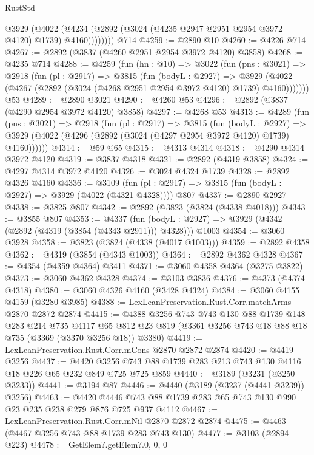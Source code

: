 \begin{lexlean}{RustStd}
\begin{coremodule}
            @3929
              (@4022 (@4234 (@2892 (@3024 (@4235 @2947 @2951 @2954 @3972 @4120) @1739) @4160))))))))
    @714
@4259 := @2890 @10
@4260 := @4226 @714
@4267 := @2892 (@3837 (@4260 @2951 @2954 @3972 @4120) @3858)
@4268 := @4235 @714
@4288 := @4259
    (fun (hn : @10) =>
    @3022
      (fun (pns : @3021) =>
      @2918
        (fun (pl : @2917) =>
        @3815
          (fun (bodyL : @2927) =>
          @3929 (@4022 (@4267 (@2892 (@3024 (@4268 @2951 @2954 @3972 @4120) @1739) @4160)))))))
    @53
@4289 := @2890 @3021
@4290 := @4260 @53
@4296 := @2892 (@3837 (@4290 @2954 @3972 @4120) @3858)
@4297 := @4268 @53
@4313 := @4289
    (fun (pns : @3021) =>
    @2918
      (fun (pl : @2917) =>
      @3815
        (fun (bodyL : @2927) =>
        @3929 (@4022 (@4296 (@2892 (@3024 (@4297 @2954 @3972 @4120) @1739) @4160))))))
@4314 := @59 @65
@4315 := @4313 @4314
@4318 := @4290 @4314 @3972 @4120
@4319 := @3837 @4318
@4321 := @2892 (@4319 @3858)
@4324 := @4297 @4314 @3972 @4120
@4326 := @3024 @4324 @1739
@4328 := @2892 @4326 @4160
@4336 := @3109 (fun (pl : @2917) => @3815 (fun (bodyL : @2927) => @3929 (@4022 (@4321 @4328)))) @807
@4337 := @2890 @2927
@4338 := @3825 @807
@4342 := @2892 (@3823 (@3824 (@4338 @4018)))
@4343 := @3855 @807
@4353 := @4337
    (fun (bodyL : @2927) => @3929 (@4342 (@2892 (@4319 (@3854 (@4343 @2911))) @4328)))
    @1003
@4354 := @3060 @3928
@4358 := @3823 (@3824 (@4338 (@4017 @1003)))
@4359 := @2892 @4358
@4362 := @4319 (@3854 (@4343 @1003))
@4364 := @2892 @4362 @4328
@4367 := @4354 (@4359 @4364) @3411
@4371 := @3060 @4358 @4364 (@3275 @3822)
@4373 := @3060 @4362 @4328
@4374 := @3103 @3836
@4376 := @4373 (@4374 @4318)
@4380 := @3060 @4326 @4160 (@3428 @4324)
@4384 := @3060 @4155 @4159 (@3280 @3985)
@4388 := LexLeanPreservation.Rust.Corr.matchArms @2870 @2872 @2874
@4415 := @4388
    @3256
    @743
    @743
    @130
    @88
    @1739
    @148
    @283
    @214
    @735
    @4117
    @65
    @812
    @23
    @819
    (@3361 @3256 @743 @18 @88 @18 @735 (@3369 (@3370 @3256 @18)) @3380)
@4419 := LexLeanPreservation.Rust.Corr.mCons @2870 @2872 @2874
@4420 := @4419 @3256
@4437 := @4420 @3256 @743 @88 @1739 @283 @213 @743 @130 @4116 @18 @226 @65 @232 @849 @725 @725 @859
@4440 := @3189 (@3231 (@3250 @3233))
@4441 := @3194 @87
@4446 := @4440 (@3189 (@3237 (@4441 @3239)) @3256)
@4463 := @4420 @4446 @743 @88 @1739 @283 @65 @743 @130 @990 @23 @235 @238 @279 @876 @725 @937 @4112
@4467 := LexLeanPreservation.Rust.Corr.mNil @2870 @2872 @2874
@4475 := @4463 (@4467 @3256 @743 @88 @1739 @283 @743 @130)
@4477 := @3103 (@2894 @223)
@4478 := GetElem?.getElem?.{0, 0, 0}

\end{coremodule}
\end{lexlean}

